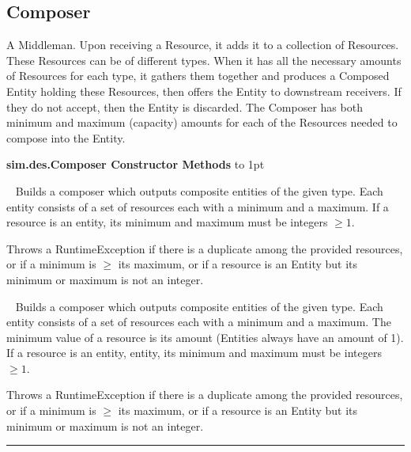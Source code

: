 \documentclass[twoside,10pt]{article}
\newcommand\class[1]{\index{Classes!{#1}}\textsf{#1}}
\newcommand*{\xfill}[1][0pt]{%
	\cleaders
		\hbox to 1pt{\hss
			\raisebox{#1}{\rule{1.2pt}{0.4pt}}%
			\hss}\hfill}
\newenvironment{methods}[1]{
\vspace{1.0em}\noindent\textsf{\textbf{#1 Methods}}\quad \xfill[0.5ex]
\vspace{-0.25em}
\begin{description}
\small}
{\end{description}\hrule\vspace{1.5em}}
\newcommand{\mthd}[1]{\item[{\sf #1}]~\newline}
\begin{document}
\subsection{Composer}

A Middleman.  Upon receiving a Resource, it adds it to a collection of Resources. These Resources can be of different types.  When it has all the necessary amounts of Resources for each type, it gathers them together and produces a Composed Entity holding these Resources, then offers the Entity to downstream receivers. If they do not accept, then the Entity is discarded.  The Composer has both minimum and maximum (capacity) amounts for each of the Resources needed to compose into the Entity.

\begin{methods}{\class{sim.des.Composer} Constructor}
\mthd{public Composer(SimState state, Entity typicalProvided, Resource[] resources, double[] minimums, double[] maximums)}
Builds a composer which outputs composite entities of the given type.  Each entity
        consists of a set of resources each with a minimum and a maximum.  If a resource is an
        entity, its minimum and maximum must be integers \(\geq 1\). 
        
	Throws a RuntimeException if there is a duplicate among the provided resources, or
        if a minimum is \(\geq\) its maximum, or if a resource is an Entity but its minimum or maximum is
        not an integer.
        
\mthd{public Composer(SimState state, Entity typicalProvided, Resource[] resources, double[] maximums)}
 Builds a composer which outputs composite entities of the given type.  Each entity
        consists of a set of resources each with a minimum and a maximum.  The minimum value of
        a resource is its amount (Entities always have an amount of 1).  If a resource is an entity, 
        entity, its minimum and maximum must be integers \(\geq 1\). 
        
       Throws a RuntimeException if there is a duplicate among the provided resources, or
        if a minimum is \(\geq\) its maximum, or if a resource is an Entity but its minimum or maximum is
        not an integer.
\end{methods}
\end{document}
